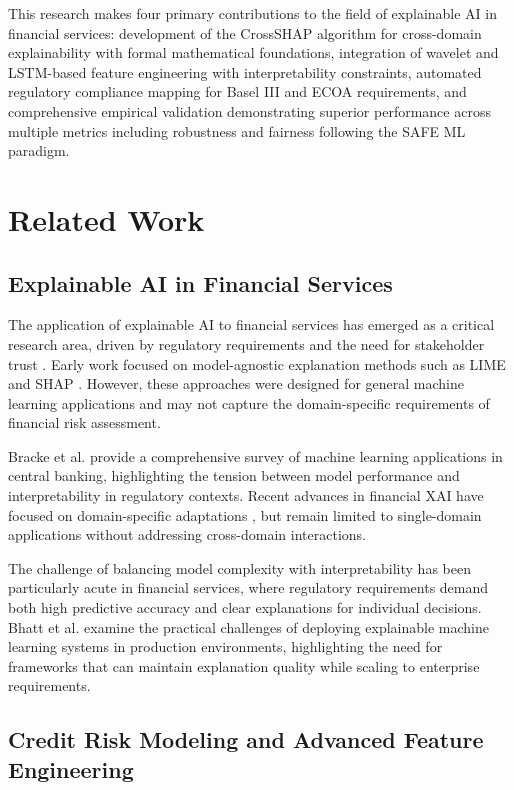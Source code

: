 \documentclass[a4paper,11pt,twoside]{article}
\newcommand{\0}{\Bf{0}}
\theoremstyle{definition}
\begin{document}
This research makes four primary contributions to the field of explainable AI in financial services: development of the CrossSHAP algorithm for cross-domain explainability with formal mathematical foundations, integration of wavelet and LSTM-based feature engineering with interpretability constraints, automated regulatory compliance mapping for Basel III and ECOA requirements, and comprehensive empirical validation demonstrating superior performance across multiple metrics including robustness and fairness following the SAFE ML paradigm.
\section{Related Work}

\subsection{Explainable AI in Financial Services}

The application of explainable AI to financial services has emerged as a critical research area, driven by regulatory requirements and the need for stakeholder trust \cite{ref5}. Early work focused on model-agnostic explanation methods such as LIME and SHAP \cite{ref6,ref7}. However, these approaches were designed for general machine learning applications and may not capture the domain-specific requirements of financial risk assessment.

Bracke et al. \cite{ref8} provide a comprehensive survey of machine learning applications in central banking, highlighting the tension between model performance and interpretability in regulatory contexts. Recent advances in financial XAI have focused on domain-specific adaptations \cite{ref9}, but remain limited to single-domain applications without addressing cross-domain interactions.

The challenge of balancing model complexity with interpretability has been particularly acute in financial services, where regulatory requirements demand both high predictive accuracy and clear explanations for individual decisions. Bhatt et al. \cite{ref10} examine the practical challenges of deploying explainable machine learning systems in production environments, highlighting the need for frameworks that can maintain explanation quality while scaling to enterprise requirements.

\subsection{Credit Risk Modeling and Advanced Feature Engineering}
\end{document}
